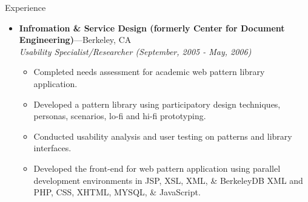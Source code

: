 \documentclass[11pt,oneside]{article}
\newenvironment{ressection}[1]{
	\vspace{4pt}
	{\fontfamily{phv}\selectfont\Large#1}
	\begin{itemize}
	\vspace{3pt}
}{
	\end{itemize}
}
\newcommand{\ressubitem}[1]{
	\vspace{-1pt}
	\item \begin{flushleft} #1 \end{flushleft}
}
\newcommand{\resbigitem}[3]{
	\vspace{-5pt}
	\item
	\textbf{#1}---#2 \\
	\textit{#3}
}
\newenvironment{ressubsec}[3]{
	\resbigitem{#1}{#2}{#3}
	\vspace{-2pt}
	\begin{itemize}
}{
	\end{itemize}
}
\begin{document}
\begin{ressection}{Experience}
	\begin{ressubsec}{Infromation \& Service Design (formerly Center for Document Engineering)}{Berkeley, CA}{Usability Specialist/Researcher (September, 2005 - May, 2006)}
	  \ressubitem{Completed needs assessment for academic web pattern library application.}
	  \ressubitem{Developed a pattern library using participatory design techniques, personas, scenarios, lo-fi and hi-fi prototyping.}
	  \ressubitem{Conducted usability analysis and user testing on patterns and library interfaces.}
	  \ressubitem{Developed the front-end for web pattern application using parallel development environments in JSP, XSL, XML, \& BerkeleyDB XML and PHP, CSS, XHTML, MYSQL, \& JavaScript.}
	\end{ressubsec}
\end{ressection}
\end{document}

